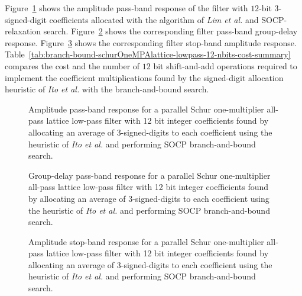 \documentclass[a4paper,twoside,10pt,english]{report}
\begin{document}
Figure~\ref{fig:branch-bound-schurOneMPAlattice-lowpass-12-nbits-pass-response}
shows the amplitude pass-band response of the filter with
$12$-bit $3$-signed-digit coefficients allocated with the algorithm of
\emph{Lim et al.} and SOCP-relaxation search.
Figure~\ref{fig:branch-bound-schurOneMPAlattice-lowpass-12-nbits-delay-response}
shows the corresponding filter pass-band group-delay response.
Figure~\ref{fig:branch-bound-schurOneMPAlattice-lowpass-12-nbits-stop-response}
shows the corresponding filter stop-band amplitude response.
Table~\ref{tab:branch-bound-schurOneMPAlattice-lowpass-12-nbits-cost-summary}
compares the cost and the number of $12$ bit shift-and-add operations required
to implement the coefficient multiplications found by the signed-digit
allocation heuristic of \emph{Ito et al.} with the branch-and-bound search.
\begin{figure}[!htbp]
\begin{center}
\scalebox{0.7}{}
\caption{Amplitude pass-band response for a parallel Schur
  one-multiplier all-pass lattice low-pass filter with 12 bit integer
  coefficients found by allocating an average of 3-signed-digits to each
  coefficient using the heuristic of \emph{Ito et al.} and performing
  SOCP branch-and-bound search.}
\label{fig:branch-bound-schurOneMPAlattice-lowpass-12-nbits-pass-response}
\end{center}
\end{figure}
\begin{figure}[!htbp]
\begin{center}
\scalebox{0.7}{}
\caption{Group-delay pass-band response for a parallel Schur
  one-multiplier all-pass lattice low-pass filter with 12 bit integer
  coefficients found by allocating an average of 3-signed-digits to each
  coefficient using the heuristic of \emph{Ito et al.} and performing
  SOCP branch-and-bound search.}
\label{fig:branch-bound-schurOneMPAlattice-lowpass-12-nbits-delay-response}
\end{center}
\end{figure}
\begin{figure}[!htbp]
\begin{center}
\scalebox{0.7}{}
\caption{Amplitude stop-band response for a parallel Schur one-multiplier
  all-pass lattice low-pass filter with 12 bit integer coefficients found by
  allocating an average of 3-signed-digits to each coefficient using the
  heuristic of \emph{Ito et al.} and performing SOCP branch-and-bound search.}
\label{fig:branch-bound-schurOneMPAlattice-lowpass-12-nbits-stop-response}
\end{center}
\end{figure}
\end{document}
